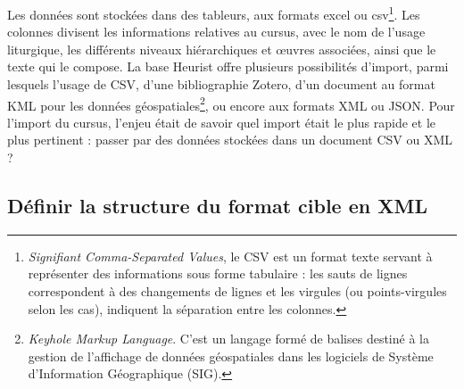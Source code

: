 \documentclass[a4paper,12pt,twoside]{book}
\begin{document}
	Les données sont stockées dans des tableurs, aux formats excel ou csv\footnote{\textit{Signifiant Comma-Separated Values}, le CSV est un format texte servant à représenter des informations sous forme tabulaire : les sauts de lignes correspondent à des changements de lignes et les virgules (ou points-virgules selon les cas), indiquent la séparation entre les colonnes.}. Les colonnes divisent les informations relatives au cursus, avec le nom de l'usage liturgique, les différents niveaux hiérarchiques et œuvres associées, ainsi que le texte qui le compose. La base Heurist offre plusieurs possibilités d'import, parmi lesquels l'usage de CSV, d'une bibliographie Zotero, d'un document au format KML pour les données géospatiales\footnote{\textit{Keyhole Markup Language}. C'est un langage formé de balises destiné à la gestion de l'affichage de données géospatiales dans les logiciels de Système d'Information Géographique (SIG).}, ou encore aux formats XML ou JSON. Pour l'import du cursus, l'enjeu était de savoir quel import était le plus rapide et le plus pertinent : passer par des données stockées dans un document CSV ou XML ?
	
	\subsection{Définir la structure du format cible en XML}
	
\end{document}
